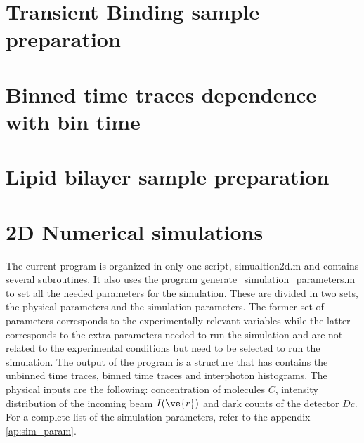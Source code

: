 \graphicspath{{./chapters/c3_binfree/si_figure/}}

\section{Transient Binding sample preparation}


\section{Binned time traces dependence with bin time}



\section{Lipid bilayer sample preparation}



\section{2D Numerical simulations}

The current program is organized in only one script, simualtion2d.m and contains several subroutines. It also uses the program generate\_simulation\_parameters.m to set all the needed parameters for the simulation. These are divided in two sets, the physical parameters and the simulation parameters. 
The former set of parameters corresponds to the experimentally relevant variables while the latter corresponds to the extra parameters needed to run the simulation and are not related to the experimental conditions but need to be selected to run the simulation. 
The output of the program is a structure that has contains the unbinned time traces, binned time traces and interphoton histograms. The physical inputs are the following: concentration of molecules $C$, intensity distribution of the incoming beam $I(\ve{r})$ and dark counts of the detector $Dc$. 
For a complete list of the simulation parameters, refer to the appendix \ref{ap:sim_param}.

